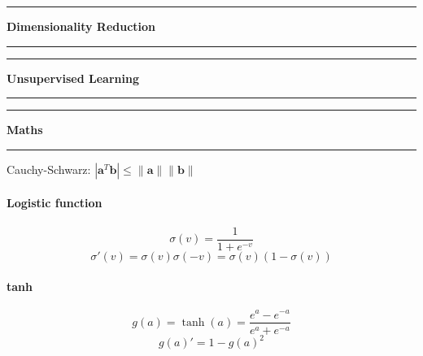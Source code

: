 \documentclass[7pt]{scrartcl}
\newlength{\secskip}
\renewcommand{\section}[1]{
  \vspace{\secskip}
  \hrule\vspace{.4em}
  \textbf{#1}
  \vspace{.4em}
  \hrule
  \vspace{\secskip}
}
\renewcommand{\vec}{\mathbf}
\begin{document}
\begin{multicols}{4}
\section{Dimensionality Reduction}
\section{Unsupervised Learning}
\section{Maths}
Cauchy-Schwarz: $|\vec a ^T \vec b|\leq \| \vec a \| \| \vec b \|$
\paragraph{Logistic function}
$$\sigma(v) = \frac{1}{1+e^{-v}}$$
$$\sigma'(v) = \sigma(v)\sigma(-v) = \sigma(v)(1-\sigma(v))$$
\paragraph{tanh}
$$g(a)=\tanh(a)=\frac{e^a-e^{-a}}{e^a + e^{-a}}$$
$$g(a)'=1 - g(a)^2$$
\end{multicols}
\end{document}
